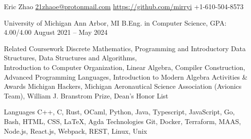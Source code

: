 \documentclass[letterpaper,11pt]{article}
\begin{document}
\rheading
  {Eric Zhao}
  {\href{mailto:21zhaoe@protonmail.com}{21zhaoe@protonmail.com}}
  {\href{https://github.com/mirryi}{https://github.com/mirryi}}
  {+1-610-504-8573}

  \begin{rsectionlist}
    \rsectionitem%
      {University of Michigan}
      {Ann Arbor, MI}
      {B.Eng. in Computer Science, GPA: 4.00/4.00}
      {August 2021 -- May 2024}
      \begin{rpointlist}
        \rpoint
          {Related Coursework}
          {Discrete Mathematics, Programming and Introductory Data Structures, Data Structures and
            Algorithms, \\ Introduction to Computer Organization, Linear Algebra, Compiler
            Construction, Advanced Programming Languages, Introduction to Modern Algebra}
        \rpoint
          {Activities \& Awards}
          {Michigan Hackers, Michigan Aeronautical Science Association (Avionics Team), William J.
            Branstrom Prize, Dean's Honor List}
      \end{rpointlist}
  \end{rsectionlist}

  \begin{rlinelist}
    \rline
      {Languages}
      {C++, C, Rust, OCaml, Python, Java, Typescript, JavaScript, Go, Bash, HTML, CSS, \LaTeX, Agda}
    \rline
      {Technologies}
      {Git, Docker, Terraform, MAAS, Node.js, React.js, Webpack, REST, Linux, Unix}
  \end{rlinelist}
\end{document}
